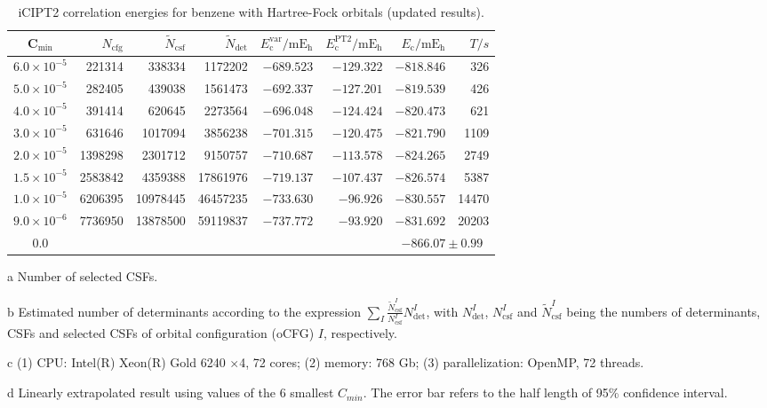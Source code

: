 \documentclass[journal=jcp,manuscript=suppinfo]{achemso}
\begin{document}
\begin{table}[!htp]
	\small
	\caption{iCIPT2 correlation energies for benzene with Hartree-Fock orbitals (updated results).}
\begin{threeparttable}
	\begin{tabular}{c|rrrrrrr}\toprule
		C$_{\text{min}}$&$N_{\mathrm{cfg}}$&$\tilde{N}_{\mathrm{csf}}$\tnote{a}&$\tilde{N}_{\mathrm{det}}$\tnote{b}
		&$E_{\mathrm{c}}^{\mathrm{var}}/\mathrm{mE_h}$&$E_{\mathrm{c}}^{\mathrm{PT2}}/\mathrm{mE_h}$&$E_{\mathrm{c}}/\mathrm{mE_h}$&$T/s$\tnote{c}\\\toprule
	$6.0\times10^{-5}$ &  221314 &   338334 & 1172202
	& $-689.523$ &    $-129.322$ &  $-818.846$ &326\\
	$5.0\times10^{-5}$ &  282405 &   439038 & 1561473
	& $-692.337$ &    $-127.201$ &  $-819.539$ &426\\
	$4.0\times10^{-5}$ &  391414 &   620645 & 2273564
	& $-696.048$ &    $-124.424$ &  $-820.473$ &621\\
	$3.0\times10^{-5}$ &  631646 &  1017094 & 3856238
	& $-701.315$ &    $-120.475$ &  $-821.790$ &1109\\
	$2.0\times10^{-5}$ & 1398298 &  2301712 & 9150757
	& $-710.687$ &    $-113.578$ &  $-824.265$ &2749\\
	$1.5\times10^{-5}$ & 2583842 &  4359388 &17861976
	& $-719.137$ &    $-107.437$ &  $-826.574$ &5387\\
	$1.0\times10^{-5}$ & 6206395 & 10978445 &46457235
	& $-733.630$ &    $-96.926$ &  $-830.557$ &14470\\
	$9.0\times10^{-6}$ & 7736950 & 13878500 &59119837
	& $-737.772$ &    $-93.920$ &  $-831.692$ &20203\\\midrule
	0.0\tnote{b}&&&&&&\multicolumn{2}{c}{$-866.07\pm0.99$}\\\bottomrule
	\end{tabular}
\begin{tablenotes}
	\item[a]Number of selected CSFs.
	\item[b]Estimated number of determinants according to the expression $\sum_I\frac{\tilde{N}_{\mathrm{csf}}^I}{N_{\mathrm{csf}}^I}N_{\mathrm{det}}^I$, with $N_{\mathrm{det}}^I$, $N_{\mathrm{csf}}^I$ and $\tilde{N}_{\mathrm{csf}}^I$ being the numbers of determinants, CSFs and selected CSFs of orbital configuration (oCFG) $I$, respectively.
	\item[c](1) CPU: Intel(R) Xeon(R) Gold 6240 $\times$4, 72 cores; (2) memory: 768 Gb; (3) parallelization: OpenMP, 72 threads.
	\item[d]Linearly extrapolated result using values of the 6 smallest $C_{min}$. The error bar refers to the half length of 95\% confidence interval.
\end{tablenotes}
\end{threeparttable}
\label{NewHF}
\end{table}
\end{document}
